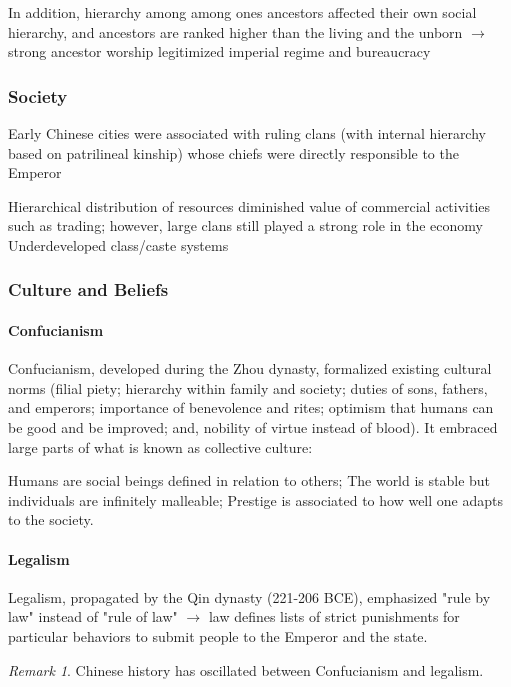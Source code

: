 \documentclass[11pt]{article}
\theoremstyle{definition}
\theoremstyle{remark}
\newtheorem*{remark}{Remark}
\begin{document}
In addition, hierarchy among among ones ancestors affected their own social hierarchy, and ancestors are ranked higher than the living and the unborn $\to$ strong ancestor worship legitimized imperial regime and bureaucracy

\subsubsection{Society}
Early Chinese cities were associated with ruling clans (with internal hierarchy based on patrilineal kinship) whose chiefs were directly responsible to the Emperor
\begin{outline}[enumerate]
\1 Hierarchical distribution of resources diminished value of commercial activities such as trading; however, large clans still played a strong role in the economy
\1 Underdeveloped class/caste systems
\end{outline}

\subsubsection{Culture and Beliefs}
\paragraph{Confucianism}
Confucianism, developed during the Zhou dynasty, formalized existing cultural norms (filial piety; hierarchy within family and society; duties of sons, fathers, and emperors; importance of benevolence and rites; optimism that humans can be good and be improved; and, nobility of virtue instead of blood). It embraced large parts of what is known as collective culture:
\begin{outline}[enumerate]
\1 Humans are social beings defined in relation to others;
\1 The world is stable but individuals are infinitely malleable;
\1 Prestige is associated to how well one adapts to the society.
\end{outline}

\paragraph{Legalism}
Legalism, propagated by the Qin dynasty (221-206 BCE), emphasized "rule by law" instead of "rule of law" $\to$ law defines lists of strict punishments for particular behaviors to submit people to the Emperor and the state.

\begin{remark}
Chinese history has oscillated between Confucianism and legalism.
\end{remark}
\end{document}
